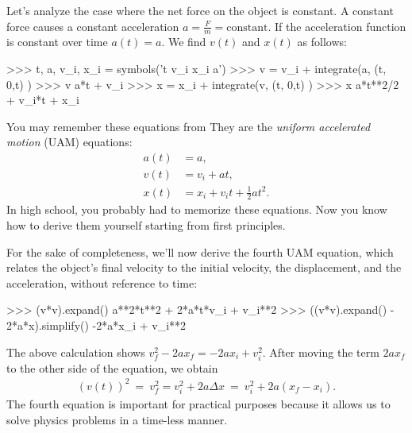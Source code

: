 Let's analyze the case where the net force on the object is constant.
A constant force causes a constant acceleration $a = \frac{F}{m} = \textrm{constant}$.
If the acceleration function is constant over time $a(t)=a$.
We find $v(t)$ and $x(t)$ as follows:
\small
\begin{verbatimtab}
>>> t, a, v_i, x_i = symbols('t v_i x_i a')
>>> v = v_i + integrate(a, (t, 0,t) )
>>> v
a*t + v_i
>>> x = x_i + integrate(v, (t, 0,t) )
>>> x
a*t**2/2 + v_i*t + x_i
\end{verbatimtab}
\normalsize

\noindent
You may remember these equations from 
They are the \emph{uniform accelerated motion} (UAM) equations:
\begin{align*}
 a(t) &= a,                                  \\ 
 v(t) &= v_i  + at,                          \\[-2mm] 
 x(t) &= x_i + v_it + \frac{1}{2}at^2.
\end{align*}
In high school, you probably had to memorize these equations.
Now you know how to derive them yourself starting from first principles.

For the sake of completeness, we'll now derive the fourth UAM equation,
which relates the object's final velocity to the initial velocity,
the displacement, and the acceleration, without reference to time:
\small
\begin{verbatimtab}
>>> (v*v).expand()
a**2*t**2 + 2*a*t*v_i + v_i**2
>>> ((v*v).expand() - 2*a*x).simplify()
-2*a*x_i + v_i**2
\end{verbatimtab}
\normalsize

\noindent
The above calculation shows $v_f^2 - 2ax_f = -2ax_i + v_i^2$.
After moving the term $2ax_f$ to the other side of the equation, we obtain
\begin{align*}
 (v(t))^2 \ = \ v_f^2 =  v_i^2  + 2a\Delta x \ = \  v_i^2  + 2a(x_f-x_i).
\end{align*}  
The fourth equation is important for practical purposes
because it allows us to solve physics problems in a time-less manner. %


